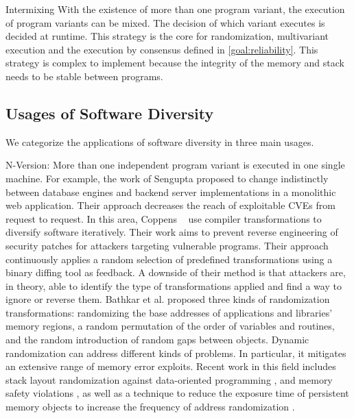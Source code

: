 \begin{strategy}{Intermixing}
    \label{strategy:S10}
    \normalfont
    With the existence of more than one program variant, the execution of program variants can be mixed. The decision of which variant executes is decided at runtime. This strategy is the core for randomization, multivariant execution and the execution by consensus defined in \autoref{goal:reliability}. This strategy is 
    complex to implement because the integrity of the memory and stack needs to be stable between programs.
\end{strategy}

\subsection*{Usages of Software Diversity}

We categorize the applications of software diversity in three main usages.

\begin{usage}{N-Version:}
    \label{usage:n-version}
    \normalfont
    More than one independent program variant is executed in one single machine. For example, the work of Sengupta \etal \cite{10.5555/3091125.3091155} proposed to change indistinctly between database engines and backend server implementations in a monolithic web application. Their approach decreases the reach of exploitable CVEs from request to request. 
    In this area, Coppens \etal~\cite{coppens2013feedback} use compiler transformations to diversify software iteratively. Their work aims to prevent reverse engineering of security patches for attackers targeting vulnerable programs.
    Their approach continuously applies a random selection of predefined transformations using a binary diffing tool as feedback. 
    A downside of their method is that attackers are, in theory, able to identify the type of transformations applied and find a way to ignore or reverse them.
    Bathkar et al. \cite{bhatkar03,bhatkar2005efficient} proposed three kinds of randomization transformations: randomizing the base addresses of applications and libraries' memory regions, a random permutation of the order of variables and routines, and the random introduction of random gaps between objects. 
    Dynamic randomization can address different kinds of problems. In particular, it mitigates an extensive range of memory error exploits. 
    Recent work in this field includes stack layout randomization against data-oriented programming \cite{aga2019smokestack}, and memory safety violations \cite{lee2021savior}, as well as a technique to reduce the exposure time of persistent memory objects to increase the frequency of address randomization \cite{xu2020merr}.
\end{usage}


